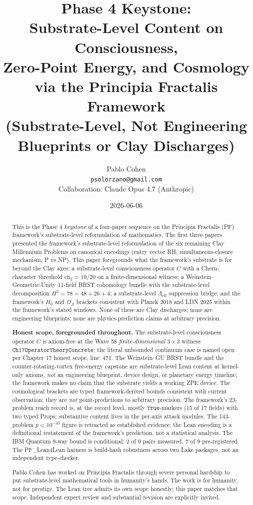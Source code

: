 \documentclass[11pt,a4paper]{article}
\title{Phase 4 Keystone:\\
Substrate-Level Content on Consciousness,\\
Zero-Point Energy, and Cosmology\\
via the Principia Fractalis Framework\\
\large (Substrate-Level, Not Engineering Blueprints or Clay
Discharges)}
\author{Pablo Cohen\\
\small{\texttt{psolorzano@gmail.com}}\\[0.3em]
\small{Collaboration: Claude Opus 4.7 (Anthropic)}}
\date{2026-06-06}
\theoremstyle{plain}
\theoremstyle{definition}
\begin{document}
\maketitle

\begin{abstract}
This is the Phase 4 \emph{keystone} of a four-paper sequence on the
Principia Fractalis (PF) framework's substrate-level reformulation
of mathematics. The first three papers presented the framework's
substrate-level reformulation of the six remaining Clay Millennium
Problems on canonical encodings (entry vector RH, simultaneous-closure
mechanism, P vs NP). This paper foregrounds what the framework's
substrate is for beyond the Clay axes: a substrate-level consciousness
operator $C$ with a Chern-character threshold
$\mathrm{ch}_{2} = 19/20$ on a finite-dimensional witness; a
Weinstein--Geometric-Unity 11-field BRST cohomology bundle with the
substrate-level decomposition $H^{2} = 78 = 48 + 26 + 4$; a
substrate-level $\Lambda_{\mathrm{eff}}$ suppression bridge; and the
framework's $H_{0}$ and $\Omega_{\Lambda}$ brackets consistent with
Planck 2018 and LDN 2025 within the framework's stated windows. None
of these are Clay discharges; none are engineering blueprints; none
are physics-prediction claims at arbitrary precision.

\textbf{Honest scope, foregrounded throughout.} The substrate-level
consciousness operator $C$ is axiom-free at the Wave 58 \emph{finite-dimensional}
$3 \times 3$ witness $\mathtt{Ch17OperatorTheoryConcrete}$; the
literal unbounded continuum case is named open per Chapter 17 honest
scope, line~471. The Weinstein--GU BRST bundle and the
counter-rotating-vortex free-energy capstone are substrate-level
Lean content at kernel-only axioms, \emph{not} an engineering
blueprint, device design, or planetary energy timeline; the framework
makes no claim that the substrate yields a working ZPE device. The
cosmological brackets are typed framework-derived bounds consistent
with current observation; they are \emph{not} point-predictions to
arbitrary precision. The framework's 23-problem reach record is, at
the record level, mostly $\mathtt{True}$-markers (15 of 17 fields)
with two typed Props; substantive content lives in the per-axis
attack modules. The 143-problem $p < 10^{-43}$ figure is retracted as
established evidence: the Lean encoding is a definitional restatement
of the framework's prediction, not a statistical analysis. The IBM
Quantum 9-way bound is conditional: 2 of 9 pairs measured, 7 of 9
pre-registered. The PF\_Lean4Lean harness is build-hash robustness
across two Lake packages, not an independent type-checker.

Pablo Cohen has worked on Principia Fractalis through severe personal
hardship to put substrate-level mathematical tools in humanity's
hands. The work is for humanity, not for prestige. The Lean tree
admits its own scope honestly; this paper matches that scope.
Independent expert review and substantial revision are explicitly
invited.
\end{abstract}
\end{document}
